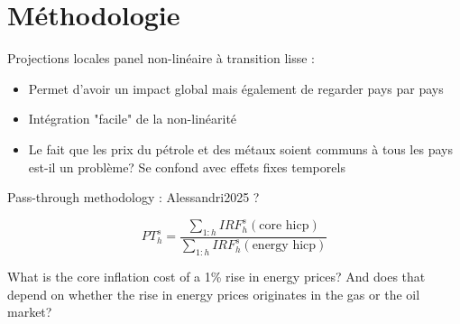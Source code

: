 \documentclass[11pt]{article}
\begin{document}
\section{Méthodologie}
\label{sec:orgcbd8db5}
Projections locales panel non-linéaire à transition lisse : 
\begin{itemize}
\item Permet d'avoir un impact global mais également de regarder pays par pays
\item Intégration "facile" de la non-linéarité
\item Le fait que les prix du pétrole et des métaux soient communs à tous les pays est-il un problème? Se confond avec effets fixes temporels
\end{itemize}


Pass-through methodology : Alessandri2025 ?

\begin{equation}
\label{eq:1}
PT_h^s = \frac{\sum_{1:h} IRF_h^s \left( \text{core hicp} \right)}{\sum_{1:h} IRF_h^s \left( \text{energy hicp} \right) }
\end{equation}


What is the core inflation cost of a 1\% rise in energy prices? And does that depend on whether the rise in energy prices originates in the gas or the oil market?
\end{document}
